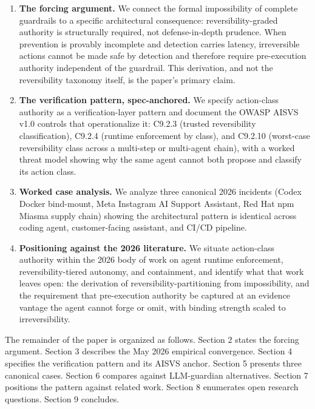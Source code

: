 \documentclass[
  11pt,
]{article}
\begin{document}
\begin{enumerate}
\def\labelenumi{\arabic{enumi}.}
\item
  \textbf{The forcing argument.} We connect the formal impossibility of
  complete guardrails to a specific architectural consequence:
  reversibility-graded authority is structurally required, not
  defense-in-depth prudence. When prevention is provably incomplete and
  detection carries latency, irreversible actions cannot be made safe by
  detection and therefore require pre-execution authority independent of
  the guardrail. This derivation, and not the reversibility taxonomy
  itself, is the paper's primary claim.
\item
  \textbf{The verification pattern, spec-anchored.} We specify
  action-class authority as a verification-layer pattern and document
  the OWASP AISVS v1.0 controls that operationalize it: C9.2.3 (trusted
  reversibility classification), C9.2.4 (runtime enforcement by class),
  and C9.2.10 (worst-case reversibility class across a multi-step or
  multi-agent chain), with a worked threat model showing why the same
  agent cannot both propose and classify its action class.
\item
  \textbf{Worked case analysis.} We analyze three canonical 2026
  incidents (Codex Docker bind-mount, Meta Instagram AI Support
  Assistant, Red Hat npm Miasma supply chain) showing the architectural
  pattern is identical across coding agent, customer-facing assistant,
  and CI/CD pipeline.
\item
  \textbf{Positioning against the 2026 literature.} We situate
  action-class authority within the 2026 body of work on agent runtime
  enforcement, reversibility-tiered autonomy, and containment, and
  identify what that work leaves open: the derivation of
  reversibility-partitioning from impossibility, and the requirement
  that pre-execution authority be captured at an evidence vantage the
  agent cannot forge or omit, with binding strength scaled to
  irreversibility.
\end{enumerate}

The remainder of the paper is organized as follows. Section 2 states the
forcing argument. Section 3 describes the May 2026 empirical
convergence. Section 4 specifies the verification pattern and its AISVS
anchor. Section 5 presents three canonical cases. Section 6 compares
against LLM-guardian alternatives. Section 7 positions the pattern
against related work. Section 8 enumerates open research questions.
Section 9 concludes.
\end{document}
